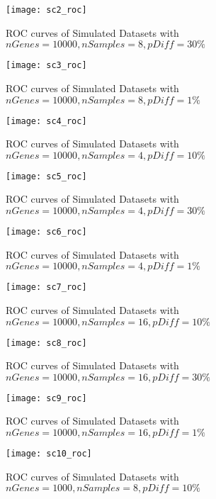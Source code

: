 \begin{figure}[h!tb] 
\texttt{[image: sc2\_roc]}
\caption{ROC curves of Simulated Datasets with $nGenes=10000, nSamples=8, pDiff=30\%$}
\label{sc2_roc}
\end{figure}

\begin{figure}[h!tb] 
\texttt{[image: sc3\_roc]}
\caption{ROC curves of Simulated Datasets with $nGenes=10000, nSamples=8, pDiff=1\%$}
\label{sc3_roc}
\end{figure}


\begin{figure}[h!tb] 
\texttt{[image: sc4\_roc]}
\caption{ROC curves of Simulated Datasets with $nGenes=10000, nSamples=4, pDiff=10\%$}
\label{sc4_roc}
\end{figure}


\begin{figure}[h!tb] 
\texttt{[image: sc5\_roc]}
\caption{ROC curves of Simulated Datasets with $nGenes=10000, nSamples=4, pDiff=30\%$}
\label{sc5_roc}
\end{figure}


\begin{figure}[h!tb] 
\texttt{[image: sc6\_roc]}
\caption{ROC curves of Simulated Datasets with $nGenes=10000, nSamples=4, pDiff=1\%$}
\label{sc6_roc}
\end{figure}

\begin{figure}[h!tb] 
\texttt{[image: sc7\_roc]}
\caption{ROC curves of Simulated Datasets with $nGenes=10000, nSamples=16, pDiff=10\%$}
\label{sc7_roc}
\end{figure}

\begin{figure}[h!tb] 
\texttt{[image: sc8\_roc]}
\caption{ROC curves of Simulated Datasets with $nGenes=10000, nSamples=16, pDiff=30\%$}
\label{sc8_roc}
\end{figure}

\begin{figure}[h!tb] 
\texttt{[image: sc9\_roc]}
\caption{ROC curves of Simulated Datasets with $nGenes=10000, nSamples=16, pDiff=1\%$}
\label{sc9_roc}
\end{figure}


\begin{figure}[h!tb] 
\texttt{[image: sc10\_roc]}
\caption{ROC curves of Simulated Datasets with $nGenes=1000, nSamples=8, pDiff=10\%$}
\label{sc10_roc}
\end{figure}




